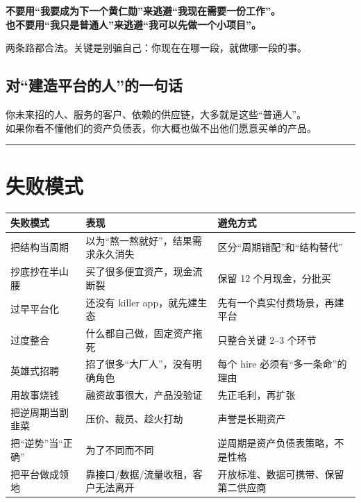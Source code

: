 \textbf{不要用``我要成为下一个黄仁勋''来逃避``我现在需要一份工作''。}\\
\textbf{也不要用``我只是普通人''来逃避``我可以先做一个小项目''。}

两条路都合法。关键是别骗自己：你现在在哪一段，就做哪一段的事。

\section{对``建造平台的人''的一句话}\label{ux5bf9ux5efaux9020ux5e73ux53f0ux7684ux4ebaux7684ux4e00ux53e5ux8bdd}

你未来招的人、服务的客户、依赖的供应链，大多就是这些``普通人''。\\
如果你看不懂他们的资产负债表，你大概也做不出他们愿意买单的产品。

\begin{center}\rule{0.5\linewidth}{0.5pt}\end{center}

\chapter{失败模式}\label{ux5931ux8d25ux6a21ux5f0f}

\begin{longtable}[]{@{}
  >{\raggedright\arraybackslash}p{}
  >{\raggedright\arraybackslash}p{}
  >{\raggedright\arraybackslash}p{}@{}}
\toprule\noalign{}
\begin{minipage}[b]{\linewidth}\raggedright
失败模式
\end{minipage} & \begin{minipage}[b]{\linewidth}\raggedright
表现
\end{minipage} & \begin{minipage}[b]{\linewidth}\raggedright
避免方式
\end{minipage} \\
\midrule\noalign{}
\endhead
\bottomrule\noalign{}
\endlastfoot
把结构当周期 & 以为``熬一熬就好''，结果需求永久消失 &
区分``周期错配''和``结构替代'' \\
抄底抄在半山腰 & 买了很多便宜资产，现金流断裂 & 保留 12
个月现金，分批买 \\
过早平台化 & 还没有 killer app，就先建生态 &
先有一个真实付费场景，再建平台 \\
过度整合 & 什么都自己做，固定资产拖死 & 只整合关键 2--3 个环节 \\
英雄式招聘 & 招了很多``大厂人''，没有明确角色 & 每个 hire
必须有``多一条命''的理由 \\
用故事烧钱 & 融资故事很大，产品没验证 & 先正毛利，再扩张 \\
把逆周期当割韭菜 & 压价、裁员、趁火打劫 & 声誉是长期资产 \\
把``逆势''当``正确'' & 为了不同而不同 &
逆周期是资产负债表策略，不是性格 \\
把平台做成领地 & 靠接口/数据/流量收租，客户无法离开 &
开放标准、数据可携带、保留第二供应商 \\
\end{longtable}

